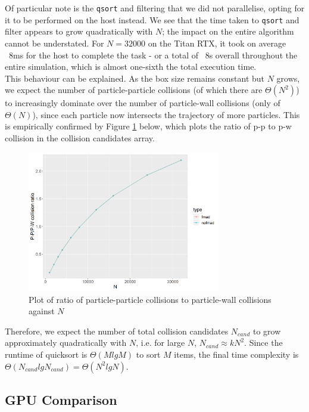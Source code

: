 \documentclass[12pt]{article}
\begin{document}
Of particular note is the \texttt{qsort} and filtering that we did not parallelise, opting for it to be performed on the host instead. We see that the time taken to \texttt{qsort} and filter appears to grow quadratically with $N$; the impact on the entire algorithm cannot be understated. For $N = 32000$ on the Titan RTX, it took on average ~8ms for the host to complete the task - or a total of ~8s overall throughout the entire simulation, which is almost one-sixth the total execution time.\\

This behaviour can be explained. As the box size remains constant but $N$ grows, we expect the number of particle-particle collisions (of which there are $\Theta(N^2)$) to increasingly dominate over the number of particle-wall collisions (only of $\Theta(N)$), since each particle now intersects the trajectory of more particles. This is empirically confirmed by Figure \ref{fig:collisionType} below, which plots the ratio of p-p to p-w collision in the collision candidates array.

\begin{figure}[H]
    \centering
    \includegraphics[width=0.75\textwidth]{collisionType}
    \caption{Plot of ratio of particle-particle collisions to particle-wall collisions against $N$}
    \label{fig:collisionType}
\end{figure}

Therefore, we expect the number of total collision candidates $N_{cand}$ to grow approximately quadratically with $N$, i.e. for large $N$, $N_{cand} \approx kN^2$. Since the runtime of quicksort is $\Theta(M lg M)$ to sort $M$ items, the final time complexity is $\Theta(N_{cand} lg N_{cand}) = \Theta(N^2lgN)$.

\subsection{GPU Comparison}
\end{document}
